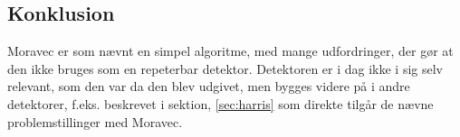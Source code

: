 \subsection*{Konklusion}
Moravec er som nævnt en simpel algoritme, med mange udfordringer, der gør at den ikke bruges som en repeterbar detektor. Detektoren er i dag ikke i sig selv relevant, som den var da den blev udgivet, men bygges videre på i andre detektorer, f.eks. \cite{Harris} beskrevet i sektion, \ref{sec:harris} som direkte tilgår de nævne problemstillinger med Moravec.
